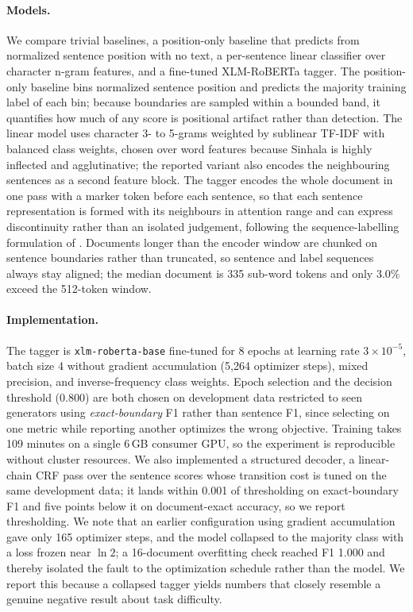 \documentclass[11pt]{article}
\begin{document}
\paragraph{Models.} We compare trivial baselines, a position-only baseline that predicts from normalized sentence position with no text, a per-sentence linear classifier over character n-gram features, and a fine-tuned XLM-RoBERTa \citep{conneau-etal-2020-unsupervised} tagger. The position-only baseline bins normalized sentence position and predicts the majority training label of each bin; because boundaries are sampled within a bounded band, it quantifies how much of any score is positional artifact rather than detection. The linear model uses character 3- to 5-grams weighted by sublinear TF-IDF with balanced class weights, chosen over word features because Sinhala is highly inflected and agglutinative; the reported variant also encodes the neighbouring sentences as a second feature block. The tagger encodes the whole document in one pass with a marker token before each sentence, so that each sentence representation is formed with its neighbours in attention range and can express discontinuity rather than an isolated judgement, following the sequence-labelling formulation of \citet{wang-etal-2023-seqxgpt}. Documents longer than the encoder window are chunked on sentence boundaries rather than truncated, so sentence and label sequences always stay aligned; the median document is 335 sub-word tokens and only 3.0\% exceed the 512-token window.

\paragraph{Implementation.} The tagger is \texttt{xlm-roberta-base} fine-tuned for 8 epochs at learning rate $3\times10^{-5}$, batch size 4 without gradient accumulation (5{,}264 optimizer steps), mixed precision, and inverse-frequency class weights. Epoch selection and the decision threshold (0.800) are both chosen on development data restricted to seen generators using \emph{exact-boundary} F1 rather than sentence F1, since selecting on one metric while reporting another optimizes the wrong objective. Training takes 109 minutes on a single 6\,GB consumer GPU, so the experiment is reproducible without cluster resources. We also implemented a structured decoder, a linear-chain CRF pass over the sentence scores whose transition cost is tuned on the same development data; it lands within 0.001 of thresholding on exact-boundary F1 and five points below it on document-exact accuracy, so we report thresholding. We note that an earlier configuration using gradient accumulation gave only 165 optimizer steps, and the model collapsed to the majority class with a loss frozen near $\ln 2$; a 16-document overfitting check reached F1 1.000 and thereby isolated the fault to the optimization schedule rather than the model. We report this because a collapsed tagger yields numbers that closely resemble a genuine negative result about task difficulty.
\end{document}
